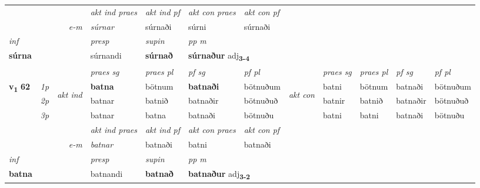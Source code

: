 \begin{longtable}[l]{X>{\footnotesize\itshape}llXXXXlXXXX}
   && &  \textit{akt ind praes} & \textit{akt ind pf} & \textit{akt con praes} & \textit{akt con pf} \\*
\multicolumn{3}{r}{\textit{e-m}} & súrnar & súrnaði & súrni & súrnaði \\*

\cmidrule{4-7}
   {\textit{inf}} & &     & \textit{presp} & \textit{supin}  & \textit{pp m} \\*
  {\textbf{súrna}} & &     & súrnandi &  \textbf{súrnað}  & \multicolumn{2}{l}{\textbf{súrnaður} adj\textbf{\textsubscript{3-4}}} \\*

\midrule

 & &   & \textit{praes sg}  & \textit{praes pl}    & \textit{ pf sg} & \textit{pf pl} & & \textit{praes sg}  & \textit{praes pl}    & \textit{pf sg} & \textit{pf pl }  \\ \cmidrule{4-7} \cmidrule{9-12}
 \multirow{2}{*}{{{\textbf{v{\textsubscript{1}}} \Large{\textbf{62}}}}}  & 1p & \multirow{3}{*}{\begin{turn}{90}\textit{akt ind}\end{turn}} & \textbf{batna} & bötnum & \textbf{batnaði} & bötnuðum & \multirow{3}{*}{\begin{turn}{90}\textit{akt con}\end{turn}} &batni & bötnum & batnaði & bötnuðum\\*
 & 2p &  &  batnar  & batnið & batnaðir & bötnuðuð & & batnir & batnið & batnaðir & bötnuðuð \\*
 & 3p &  & batnar & batna & batnaði & bötnuðu & & batni & batni& batnaði & bötnuðu \\*
\cmidrule{4-7} \cmidrule{9-12}

   && &  \textit{akt ind praes} & \textit{akt ind pf} & \textit{akt con praes} & \textit{akt con pf} \\*
\multicolumn{3}{r}{\textit{e-m}} & batnar & batnaði & batni & batnaði \\*

\cmidrule{4-7}
   {\textit{inf}} & &     & \textit{presp} & \textit{supin}  & \textit{pp m} \\*
  {\textbf{batna}} & &     & batnandi &  \textbf{batnað}  & \multicolumn{2}{l}{\textbf{batnaður} adj\textbf{\textsubscript{3-2}}} \\*

\midrule


\end{longtable}
